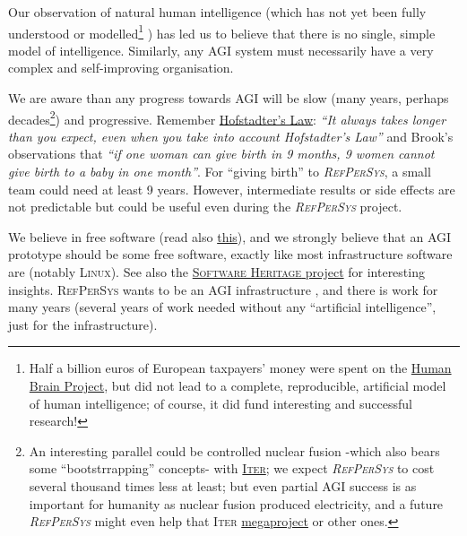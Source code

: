 \documentclass[11pt,a4paper,svgnames]{article}
\newcommand{\RefPerSys}{{\textit{\textsc{RefPerSys}}}}
\begin{document}
Our observation of natural human intelligence (which has not yet been fully
understood or modelled\footnote{
    Half a billion euros of European taxpayers' money were spent on the
    \href{https://www.humanbrainproject.eu}{Human Brain Project}, but did not
    lead to a complete, reproducible, artificial model of human intelligence;
    of course, it did fund interesting and successful research!
}
) has led us to believe that there is no single, simple model of intelligence. 
Similarly, any AGI system must necessarily have a very complex and self-improving
organisation.

We are aware than any progress towards AGI will be slow (many years,
perhaps decades\footnote{An interesting parallel could be controlled
  nuclear fusion -which also bears some ``bootstrrapping'' concepts-
  with \href{https://en.wikipedia.org/wiki/ITER}{\textsc{Iter}}; we
  expect {\RefPerSys} to cost several thousand times less at least;
  but even partial AGI success is as important for humanity as nuclear
  fusion produced electricity, and a future {\RefPerSys} might even
  help that \textsc{Iter}
  \href{https://en.wikipedia.org/wiki/Megaproject}{megaproject} or
  other ones.}) and progressive. Remember
  \href{https://en.wikipedia.org/wiki/Hofstadter's_law}{Hofstadter's
    Law}: \textit{``It always takes longer than you expect, even when
    you take into account Hofstadter's Law''}
  \cite{Hofstadter:1979:GEB} and Brook's observations
  \cite{Brooks:1987:NSB, Brooks:1995:MM} that \emph{``if one woman can give
  birth in 9 months, 9 women cannot give birth to a baby in one
  month''}. For ``giving birth'' to {\RefPerSys}, a small team could
  need at least 9 years. However, intermediate results or side effects
  are not predictable but could be useful even during the {\RefPerSys}
  project.

We believe in free software  (read also
\href{https://www.fsf.org/about/what-is-free-software}{this}), and we
strongly believe that an AGI prototype should be some free software,
exactly like most infrastructure software are (notably
\textsc{Linux}). See also the
\href{https://www.softwareheritage.org/}{\textsc{Software Heritage}
  project}  for interesting insights. \textsc{RefPerSys} wants to be an
AGI infrastructure , and there is work for many years (several years of
work needed without any ``artificial intelligence'', just for the
infrastructure).
\end{document}
